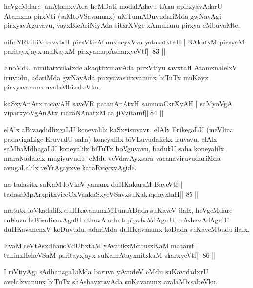 \begin{artha}
heVgeMdare- anAtamxvAda heMDati modalAdavu tAnu apirxyavAdarU Atamxna pirxVti (saMtoVSavanunx) uMTumADuvudariMda gwNavAgi pirxyavAguvavu, vayxBicAriNiyAda sitxrXVge kAmukanu pirxya eMbuvaMte.
\end{artha}

\begin{shl}
niheYRtukiV savxtaH pirxVtirAtamxneyxVva yatasatxtaH |
BAkatxM pirxyaM paritayxjayx muKayxM pirxyamupAsharxyeVtf\hfill || 83 ||
\end{shl}

\begin{artha}
EnoMdU nimitatxvilalxde akaqtirxmavAda pirxVtiyu savxtaH AtamxnalelxV iruvudu, adariMda gwNavAda pirxyavasutxvanunx biTuTx muKayx pirxyavanunx avalaMbisabeVku.
\end{artha}

\begin{shl}
kaSxyAnAtx nicayAH saveVR patanAnAtxH samucaCxrXyAH |
saMyoVgA viparxyoVgAnAtx maraNAnatxM ca jiVvitamf\hfill || 84 ||
\end{shl}

\begin{artha}
elAlx aBivaqdidhxgaLU koneyalilx kaSxyisuvavu, elAlx ErikegaLU (meVlina
padavigaLige EruvudU saha) koneyalilx biVLuvudakekx iruvavu. elAlx
saMbaMdhagaLU koneyalilx biTuTx hoVguvavu, badukU saha koneyalilx
maraNadalelx mugiyuvudu- eMdu veVdavAyxsara vacanaviruvudariMda
avugaLalilx veYrAgayxve kataRvayxvAgide.
\end{artha}

\begin{shl}
na tadasitx suKaM loVkeV yananx duHKakaraM BaveVtf |
tadasaMpArxpitxviceCxVdakaSxyeVSavxsuKakaqdayxtaH\hfill || 85 ||
\end{shl}

\begin{artha}
matutx loVkadalilx duHKavanunxMTumADada suKaveV ilalx, heVgeMdare suKavu laBisadiruvAgalU athavA adu tapipxhoVdAgalU, nAshavAdAgalU duHKavanenxV koDuvudu. adariMda duHKavanunx koDada suKaveMbudu ilalx.
\end{artha}

\begin{shl}
EvaM ceVtAsxdhanoVdUBxtaM yAvatikxMcitusxKaM matamf |
taninxHsheVSaM paritayxjayx suKamAtayxnitxkaM sharxyeVtf\hfill || 86 ||
\end{shl}

\begin{artha}
I riVtiyAgi sAdhanagaLiMda baruva yAvudeV oMdu suKavidadxrU avelalxvanunx biTuTx shAshavxtavAda suKavanunx avalaMbisabeVku.
\end{artha}

